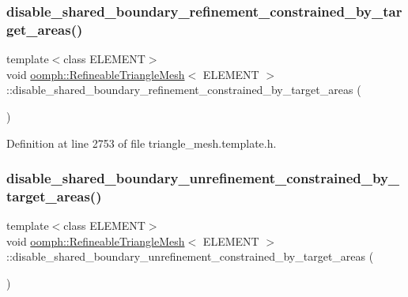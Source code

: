 \subsubsection{\texorpdfstring{disable\+\_\+shared\+\_\+boundary\+\_\+refinement\+\_\+constrained\+\_\+by\+\_\+target\+\_\+areas()}{disable\_shared\_boundary\_refinement\_constrained\_by\_target\_areas()}}
{\footnotesize\ttfamily template$<$class E\+L\+E\+M\+E\+NT$>$ \\
void \hyperlink{classoomph_1_1RefineableTriangleMesh}{oomph\+::\+Refineable\+Triangle\+Mesh}$<$ E\+L\+E\+M\+E\+NT $>$\+::disable\+\_\+shared\+\_\+boundary\+\_\+refinement\+\_\+constrained\+\_\+by\+\_\+target\+\_\+areas (\begin{DoxyParamCaption}{ }\end{DoxyParamCaption})\hspace{0.3cm}{\ttfamily [inline]}}



Definition at line 2753 of file triangle\+\_\+mesh.\+template.\+h.

\mbox{\label{classoomph_1_1RefineableTriangleMesh_a6f8615dc6e68b6a8fdf0e4f3b5bb1e12}} 
\subsubsection{\texorpdfstring{disable\+\_\+shared\+\_\+boundary\+\_\+unrefinement\+\_\+constrained\+\_\+by\+\_\+target\+\_\+areas()}{disable\_shared\_boundary\_unrefinement\_constrained\_by\_target\_areas()}}
{\footnotesize\ttfamily template$<$class E\+L\+E\+M\+E\+NT$>$ \\
void \hyperlink{classoomph_1_1RefineableTriangleMesh}{oomph\+::\+Refineable\+Triangle\+Mesh}$<$ E\+L\+E\+M\+E\+NT $>$\+::disable\+\_\+shared\+\_\+boundary\+\_\+unrefinement\+\_\+constrained\+\_\+by\+\_\+target\+\_\+areas (\begin{DoxyParamCaption}{ }\end{DoxyParamCaption})\hspace{0.3cm}{\ttfamily [inline]}}




